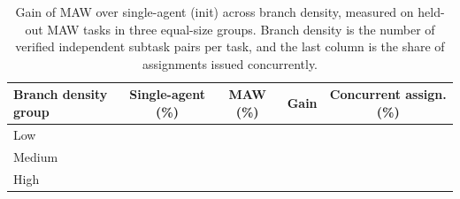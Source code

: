 \begin{table}[t]
\centering
\small
\caption{Gain of MAW over single-agent (init) across branch density, measured on held-out MAW tasks in three equal-size groups. Branch density is the number of verified independent subtask pairs per task, and the last column is the share of assignments issued concurrently.}
\label{tab:branch-density}
\setlength{\tabcolsep}{6pt}
\renewcommand{\arraystretch}{1.12}
\begin{tabular}{@{}lcccc@{}}
\toprule
Branch density group & Single-agent (\%) & MAW (\%) & Gain \up & Concurrent assign. (\%) \\
\midrule
Low & & & & \\
Medium & & & & \\
High & & & & \\
\bottomrule
\end{tabular}
\end{table}
